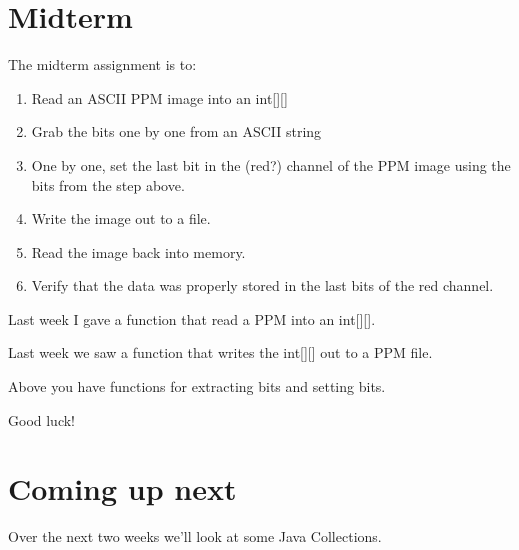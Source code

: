 \documentclass[12pt]{article}
\begin{document}
\section{Midterm}

The midterm assignment is to:
\begin{enumerate}
\item Read an ASCII PPM image into an int[][]
\item Grab the bits one by one from an ASCII string
\item One by one, set the last bit in the (red?) channel of the PPM image using the bits from the step above.
\item Write the image out to a file.
\item Read the image back into memory.
\item Verify that the data was properly stored in the last bits of the red channel.
\end{enumerate}

Last week I gave a function that read a PPM into an int[][]. 

Last week we saw a function that writes the int[][] out to a PPM file.

Above you have functions for extracting bits and setting bits.

Good luck!

\section{Coming up next}
Over the next two weeks we'll look at some Java Collections.
\end{document}
